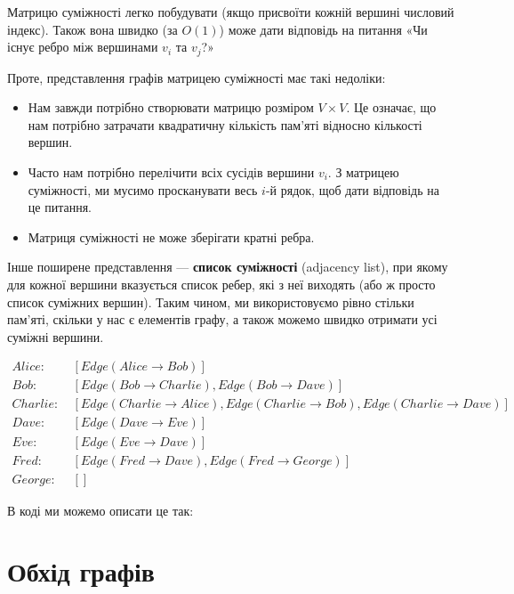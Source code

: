 \documentclass[12pt,a4paper]{report}
\begin{document}
Матрицю суміжності легко побудувати (якщо присвоїти кожній вершині числовий індекс). Також вона швидко (за \(O(1)\)) може дати відповідь на питання «Чи існує ребро між вершинами \(v_i\) та \(v_j\)?»

Проте, представлення графів матрицею суміжності має такі недоліки:
\begin{itemize}
    \item Нам завжди потрібно створювати матрицю розміром \(V \times V\). Це означає, що нам потрібно затрачати квадратичну кількість пам’яті відносно кількості вершин.
    \item Часто нам потрібно перелічити всіх сусідів вершини \(v_i\). З матрицею суміжності, ми мусимо просканувати весь \(i\)-й рядок, щоб дати відповідь на це питання.
    \item Матриця суміжності не може зберігати кратні ребра.
\end{itemize}

Інше поширене представлення --- \textbf{список суміжності} (adjacency list), при якому для кожної вершини вказується список ребер, які з неї виходять (або ж просто список суміжних вершин). Таким чином, ми використовуємо рівно стільки пам’яті, скільки у нас є елементів графу, а також можемо швидко отримати усі суміжні вершини.

\begin{align*}
    Alice:    & \  [Edge(Alice \rightarrow Bob)] \\
    Bob:      & \  [Edge(Bob \rightarrow Charlie), Edge(Bob \rightarrow Dave)] \\
    Charlie:  & \  [Edge(Charlie \rightarrow Alice), Edge(Charlie \rightarrow Bob), Edge(Charlie \rightarrow Dave)] \\
    Dave:     & \  [Edge(Dave \rightarrow Eve)] \\
    Eve:      & \  [Edge(Eve \rightarrow Dave)] \\
    Fred:     & \  [Edge(Fred \rightarrow Dave), Edge(Fred \rightarrow George)] \\
    George:   & \  []
\end{align*}

В коді ми можемо описати це так:





\section{Обхід графів}
\end{document}
